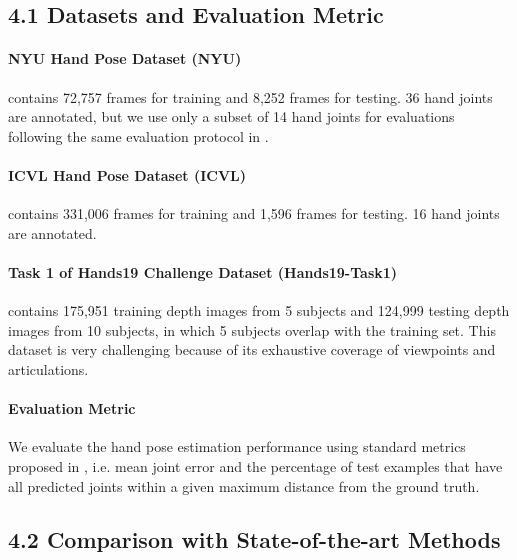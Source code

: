 \documentclass[letterpaper]{article} \usepackage{aaai22}  \usepackage{times}  \usepackage{helvet}  \usepackage{courier}  \usepackage[hyphens]{url}  \usepackage{graphicx} \urlstyle{rm} \def\UrlFont{\rm}  \usepackage{natbib}  \usepackage{caption} \DeclareCaptionStyle{ruled}{labelfont=normalfont,labelsep=colon,strut=off} \frenchspacing  \setlength{\pdfpagewidth}{8.5in}  \setlength{\pdfpageheight}{11in}  \usepackage{algorithm}
\begin{document}
\subsection{4.1 Datasets and Evaluation Metric}
\paragraph{NYU Hand Pose Dataset (NYU)} \cite{tompson2014real} contains 72,757 frames for training and 8,252 frames for testing. 36 hand joints are annotated,  but we use only a subset of 14 hand joints for evaluations following the same evaluation protocol in \cite{tompson2014real}.

\paragraph{ICVL Hand Pose Dataset (ICVL)} \cite{tang2014latent} contains 331,006 frames for training and 1,596 frames for testing. 16 hand joints are annotated.

\paragraph{Task 1 of Hands19 Challenge Dataset (Hands19-Task1)} \cite{armagan2020measuring} contains 175,951 training depth images from 5 subjects and 124,999 testing depth images from 10  subjects, in which 5 subjects overlap with the training set. This dataset is very challenging because of its exhaustive coverage of viewpoints and articulations.

\paragraph{Evaluation Metric} We evaluate the hand pose estimation performance using standard metrics proposed in \cite{tang2014latent}, i.e. mean joint error and the percentage of test examples that have all predicted joints within a given maximum distance from the ground truth.

\subsection{4.2 Comparison with State-of-the-art Methods}
\end{document}
